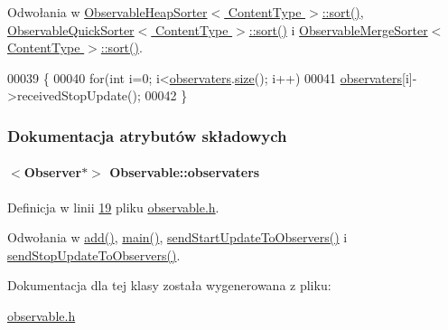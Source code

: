 Odwołania w \hyperlink{observableheapsorter_8h_source_l00026}{Observable\-Heap\-Sorter$<$ Content\-Type $>$\-::sort()}, \hyperlink{observablequicksorter_8h_source_l00026}{Observable\-Quick\-Sorter$<$ Content\-Type $>$\-::sort()} i \hyperlink{observablemergesorter_8h_source_l00026}{Observable\-Merge\-Sorter$<$ Content\-Type $>$\-::sort()}.


\begin{DoxyCode}
00039                                       \{
00040         \textcolor{keywordflow}{for}(\textcolor{keywordtype}{int} i=0; i<\hyperlink{class_observable_af5af34ef633e707ca1525415ee963b91}{observaters}.\hyperlink{class_linked_list_ab399f1dc929c705e9cba628ae1f29254}{size}(); i++)
00041                 \hyperlink{class_observable_af5af34ef633e707ca1525415ee963b91}{observaters}[i]->receivedStopUpdate();
00042     \}
\end{DoxyCode}


\subsubsection{Dokumentacja atrybutów składowych}
\hypertarget{class_observable_af5af34ef633e707ca1525415ee963b91}{
\paragraph[{observaters}]{$<${\bf Observer}$\ast$$>$ Observable\-::observaters}}\label{class_observable_af5af34ef633e707ca1525415ee963b91}


Definicja w linii \hyperlink{observable_8h_source_l00019}{19} pliku \hyperlink{observable_8h_source}{observable.\-h}.



Odwołania w \hyperlink{observable_8h_source_l00023}{add()}, \hyperlink{main_8cpp_source_l00022}{main()}, \hyperlink{observable_8h_source_l00029}{send\-Start\-Update\-To\-Observers()} i \hyperlink{observable_8h_source_l00039}{send\-Stop\-Update\-To\-Observers()}.



Dokumentacja dla tej klasy została wygenerowana z pliku\-:\begin{DoxyCompactItemize}
\item 
\hyperlink{observable_8h}{observable.\-h}\end{DoxyCompactItemize}
